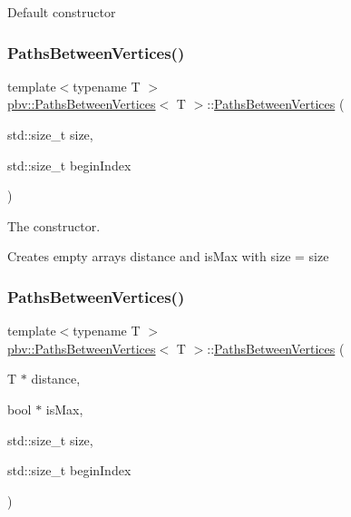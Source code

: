 Default constructor \mbox{\label{structpbv_1_1_paths_between_vertices_a352d3e86d9e9776ad7c9ec69844d5651}} 
\subsubsection{\texorpdfstring{Paths\+Between\+Vertices()}{PathsBetweenVertices()}\hspace{0.1cm}{\footnotesize\ttfamily [2/4]}}
{\footnotesize\ttfamily template$<$typename T $>$ \\
\mbox{\hyperlink{structpbv_1_1_paths_between_vertices}{pbv\+::\+Paths\+Between\+Vertices}}$<$ T $>$\+::\mbox{\hyperlink{structpbv_1_1_paths_between_vertices}{Paths\+Between\+Vertices}} (\begin{DoxyParamCaption}\item[{std\+::size\+\_\+t}]{size,  }\item[{std\+::size\+\_\+t}]{begin\+Index }\end{DoxyParamCaption})}



The constructor. 

Creates empty arrays \textquotesingle{}distance\textquotesingle{} and \textquotesingle{}is\+Max\textquotesingle{} with size = \textquotesingle{}size\textquotesingle{} \mbox{\label{structpbv_1_1_paths_between_vertices_a774e36d73a973b9e301e4dbce74b7b29}} 
\subsubsection{\texorpdfstring{Paths\+Between\+Vertices()}{PathsBetweenVertices()}\hspace{0.1cm}{\footnotesize\ttfamily [3/4]}}
{\footnotesize\ttfamily template$<$typename T $>$ \\
\mbox{\hyperlink{structpbv_1_1_paths_between_vertices}{pbv\+::\+Paths\+Between\+Vertices}}$<$ T $>$\+::\mbox{\hyperlink{structpbv_1_1_paths_between_vertices}{Paths\+Between\+Vertices}} (\begin{DoxyParamCaption}\item[{T $\ast$}]{distance,  }\item[{bool $\ast$}]{is\+Max,  }\item[{std\+::size\+\_\+t}]{size,  }\item[{std\+::size\+\_\+t}]{begin\+Index }\end{DoxyParamCaption})}

